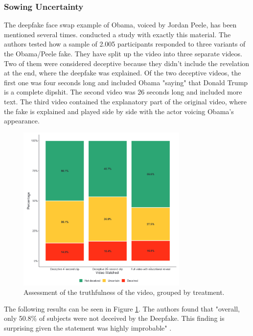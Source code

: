\documentclass[
  a4paper,  %
  twoside,  %
  bibliography=totoc,
  headsepline,
  cleardoublepage=empty,
  parskip=half,
  draft=false
]{scrbook}
\begin{document}
\subsubsection*{Sowing Uncertainty}
The deepfake face swap example of Obama, voiced by Jordan Peele, has been mentioned several times. \citeauthor{vaccariDeepfakesDisinformationExploring2020} conducted a study with exactly this material. The authors tested how a sample of 2.005 participants responded to three variants of the Obama/Peele fake. They have split up the video into three separate videos. Two of them were considered deceptive because they didn't include the revelation at the end, where the deepfake was explained. Of the two deceptive videos, the first one was four seconds long and included Obama "saying" that Donald Trump is a complete dipshit. The second video was 26 seconds long and included more text. The third video contained the explanatory part of the original video, where the fake is explained and played side by side with the actor voicing Obama's appearance.
\begin{figure}[h]
  \centering
  \includegraphics[width=0.75\textwidth]{./graphics/images/obamafake.png}
  \caption{Assessment of the truthfulness of the video, grouped by treatment. \cite{vaccariDeepfakesDisinformationExploring2020}}
  \label{fig:obamafake-eval}
\end{figure}
The following results can be seen in Figure \ref{fig:obamafake-eval}. The authors found that "overall, only 50.8\% of subjects were not deceived by the Deepfake. This finding is surprising given the statement was highly improbable" \cite{vaccariDeepfakesDisinformationExploring2020}. 
\end{document}
